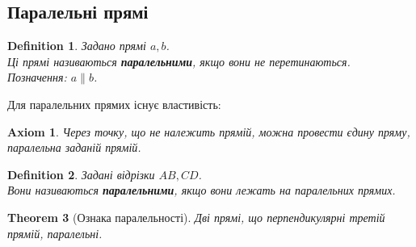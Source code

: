 \documentclass[a4paper, 10pt]{article}
\theoremstyle{theoremdd}
\newtheorem{theorem}{Theorem}[subsection]
\theoremstyle{theoremdd}
\newtheorem{axiom}{Axiom}
\theoremstyle{theoremdd}
\newtheorem{definition}[theorem]{Definition}
\theoremstyle{theoremdd}
\theoremstyle{theoremdd}
\theoremstyle{theoremdd}
\theoremstyle{theoremdd}
\theoremstyle{theoremdd}
\theoremstyle{theoremdd}
\begin{document}
\subsection{Паралельні прямі}
\begin{definition}
Задано прямі $a,b$.\\
Ці прямі називаються \textbf{паралельними}, якщо вони не перетинаються.\\
Позначення: $a \parallel b$.
\begin{figure}[H]
\centering
{}
\end{figure}
\end{definition}

Для паралельних прямих існує властивість:
\begin{axiom}
Через точку, що не належить прямій, можна провести єдину пряму, паралельна заданій прямій.
\end{axiom}

\begin{definition}
Задані відрізки $AB,CD$.\\
Вони називаються \textbf{паралельними}, якщо вони лежать на паралельних прямих.
\begin{figure}[H]
\centering
{}
\end{figure}
\end{definition}

\begin{theorem}[Ознака паралельності]
Дві прямі, що перпендикулярні третій прямій, паралельні.
\end{theorem}
\end{document}
